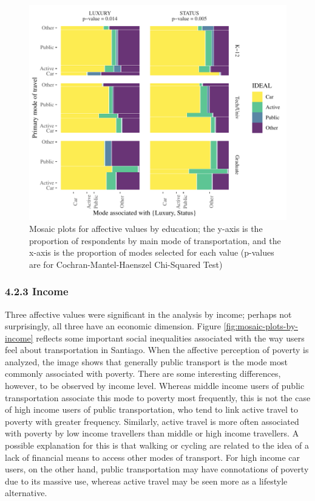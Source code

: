 \documentclass[]{elsarticle} %
\makeatletter
\def\maxwidth{\ifdim\Gin@nat@width>\linewidth\linewidth
\else\Gin@nat@width\fi}
\let\Oldincludegraphics\includegraphics
\renewcommand{\includegraphics}[1]{\Oldincludegraphics[width=\maxwidth]{#1}}
\makeatother
\begin{document}
\begin{figure}
\centering
\includegraphics{Dissonance_Santiago_v1_files/figure-latex/figure-mosaic-plots-by-attribute-and-education-1.pdf}
\caption{\label{fig:mosaic-plots-by-education}Mosaic plots for affective
values by education; the y-axis is the proportion of respondents by main
mode of transportation, and the x-axis is the proportion of modes
selected for each value (p-values are for Cochran-Mantel-Haenszel
Chi-Squared Test)}
\end{figure}

\hypertarget{income-1}{%
\subsubsection{4.2.3 Income}\label{income-1}}

Three affective values were significant in the analysis by income;
perhaps not surprisingly, all three have an economic dimension. Figure
\ref{fig:mosaic-plots-by-income} reflects some important social
inequalities associated with the way users feel about transportation in
Santiago. When the affective perception of poverty is analyzed, the
image shows that generally public transport is the mode most commonly
associated with poverty. There are some interesting differences,
however, to be observed by income level. Whereas middle income users of
public transportation associate this mode to poverty most frequently,
this is not the case of high income users of public transportation, who
tend to link active travel to poverty with greater frequency. Similarly,
active travel is more often associated with poverty by low income
travellers than middle or high income travellers. A possible explanation
for this is that walking or cycling are related to the idea of a lack of
financial means to access other modes of transport. For high income car
users, on the other hand, public transportation may have connotations of
poverty due to its massive use, whereas active travel may be seen more
as a lifestyle alternative.
\end{document}
